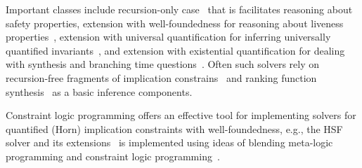 \documentclass{new_tlp}
\begin{document}
Important classes include recursion-only
case~\cite{muz,GrebenshchikovPLDI12,Duality,RummerDisj2013} that is
facilitates reasoning about safety properties, extension with
well-foundedness for reasoning about liveness
properties~\cite{GrebenshchikovPLDI12}, extension with universal
quantification for inferring universally quantified
invariants~\cite{UnivSAS2013}, and extension with existential
quantification for dealing with synthesis and branching time
questions~\cite{ehsf}.
Often such solvers rely on recursion-free fragments of implication
constrains~\cite{McMillanSplitProver,HornLIUIF11,InterSystems13,TreeVampire13}
and ranking function synthesis~\cite{RybalPodelskiVMCAI04} as a basic
inference components.

Constraint logic programming offers an effective tool for implementing
solvers for quantified (Horn) implication constraints with
well-foundedness, e.g., the HSF solver and its
extensions~\cite{HSF,ehsf,UnivSAS2013} is implemented using ideas of
blending meta-logic programming and constraint logic
programming~\cite{RybalPodelskiPADL07}.


 

\end{document}
